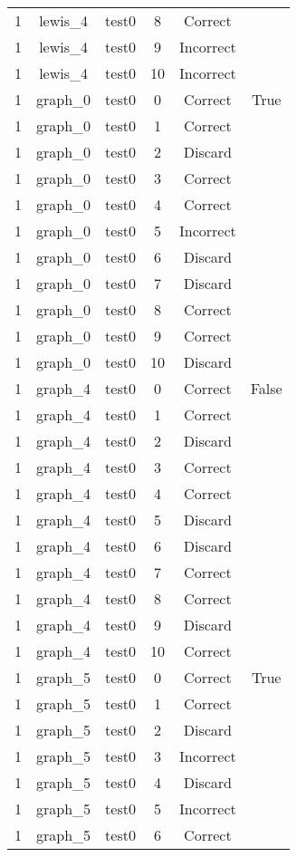\begin{longtable}{|c|c|c|c|c|c|}
1 & lewis\_4 & test0 & 8 & Correct &  \\ 
1 & lewis\_4 & test0 & 9 & Incorrect &  \\ 
1 & lewis\_4 & test0 & 10 & Incorrect &  \\ 
1 & graph\_0 & test0 & 0 & Correct & True \\ 
1 & graph\_0 & test0 & 1 & Correct &  \\ 
1 & graph\_0 & test0 & 2 & Discard &  \\ 
1 & graph\_0 & test0 & 3 & Correct &  \\ 
1 & graph\_0 & test0 & 4 & Correct &  \\ 
1 & graph\_0 & test0 & 5 & Incorrect &  \\ 
1 & graph\_0 & test0 & 6 & Discard &  \\ 
1 & graph\_0 & test0 & 7 & Discard &  \\ 
1 & graph\_0 & test0 & 8 & Correct &  \\ 
1 & graph\_0 & test0 & 9 & Correct &  \\ 
1 & graph\_0 & test0 & 10 & Discard &  \\ 
1 & graph\_4 & test0 & 0 & Correct & False \\ 
1 & graph\_4 & test0 & 1 & Correct &  \\ 
1 & graph\_4 & test0 & 2 & Discard &  \\ 
1 & graph\_4 & test0 & 3 & Correct &  \\ 
1 & graph\_4 & test0 & 4 & Correct &  \\ 
1 & graph\_4 & test0 & 5 & Discard &  \\ 
1 & graph\_4 & test0 & 6 & Discard &  \\ 
1 & graph\_4 & test0 & 7 & Correct &  \\ 
1 & graph\_4 & test0 & 8 & Correct &  \\ 
1 & graph\_4 & test0 & 9 & Discard &  \\ 
1 & graph\_4 & test0 & 10 & Correct &  \\ 
1 & graph\_5 & test0 & 0 & Correct & True \\ 
1 & graph\_5 & test0 & 1 & Correct &  \\ 
1 & graph\_5 & test0 & 2 & Discard &  \\ 
1 & graph\_5 & test0 & 3 & Incorrect &  \\ 
1 & graph\_5 & test0 & 4 & Discard &  \\ 
1 & graph\_5 & test0 & 5 & Incorrect &  \\ 
1 & graph\_5 & test0 & 6 & Correct &  \\ 

\end{longtable}
